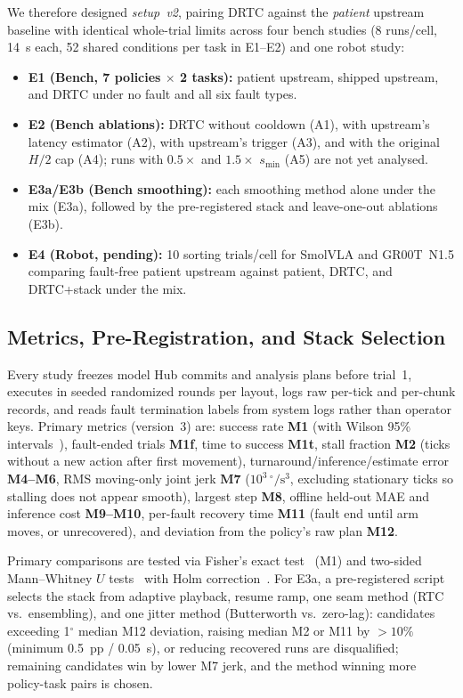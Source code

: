 \documentclass[conference]{IEEEtran}
\newcommand{\drtc}{DRTC}
\newcommand{\smolvla}{SmolVLA}
\newcommand{\groot}{GR00T~N1.5}
\newcommand{\jerkunit}{$10^3\,^\circ/\mathrm{s}^3$}
\begin{document}
We therefore designed \emph{setup~v2}, pairing \drtc{} against the \emph{patient} upstream baseline with identical whole-trial limits across four bench studies (8 runs/cell, 14~s each, 52 shared conditions per task in E1--E2) and one robot study:
\begin{itemize}
  \item \textbf{E1 (Bench, 7 policies $\times$ 2 tasks):} patient upstream, shipped upstream, and \drtc{} under no fault and all six fault types.
  \item \textbf{E2 (Bench ablations):} \drtc{} without cooldown (A1), with upstream's latency estimator (A2), with upstream's trigger (A3), and with the original $H/2$ cap (A4); runs with $0.5\times$ and $1.5\times$ $s_{\min}$ (A5) are not yet analysed.
  \item \textbf{E3a/E3b (Bench smoothing):} each smoothing method alone under the mix (E3a), followed by the pre-registered stack and leave-one-out ablations (E3b).
  \item \textbf{E4 (Robot, pending):} 10 sorting trials/cell for \smolvla{} and \groot{} comparing fault-free patient upstream against patient, \drtc{}, and \drtc{}+stack under the mix.
\end{itemize}

\subsection{Metrics, Pre-Registration, and Stack Selection}

Every study freezes model Hub commits and analysis plans before trial~1, executes in seeded randomized rounds per layout, logs raw per-tick and per-chunk records, and reads fault termination labels from system logs rather than operator keys. Primary metrics (version~3) are: success rate \textbf{M1} (with Wilson 95\% intervals~\cite{wilson1927}), fault-ended trials \textbf{M1f}, time to success \textbf{M1t}, stall fraction \textbf{M2} (ticks without a new action after first movement), turnaround/inference/estimate error \textbf{M4--M6}, RMS moving-only joint jerk \textbf{M7} (\jerkunit{}, excluding stationary ticks so stalling does not appear smooth), largest step \textbf{M8}, offline held-out MAE and inference cost \textbf{M9--M10}, per-fault recovery time \textbf{M11} (fault end until arm moves, or unrecovered), and deviation from the policy's raw plan \textbf{M12}.

Primary comparisons are tested via Fisher's exact test~\cite{fisher1935} (M1) and two-sided Mann--Whitney $U$ tests~\cite{mann1947} with Holm correction~\cite{holm1979}. For E3a, a pre-registered script selects the stack from adaptive playback, resume ramp, one seam method (RTC vs.\ ensembling), and one jitter method (Butterworth vs.\ zero-lag): candidates exceeding 1$^\circ$ median M12 deviation, raising median M2 or M11 by $>10\%$ (minimum 0.5~pp / 0.05~s), or reducing recovered runs are disqualified; remaining candidates win by lower M7 jerk, and the method winning more policy-task pairs is chosen.
\end{document}
